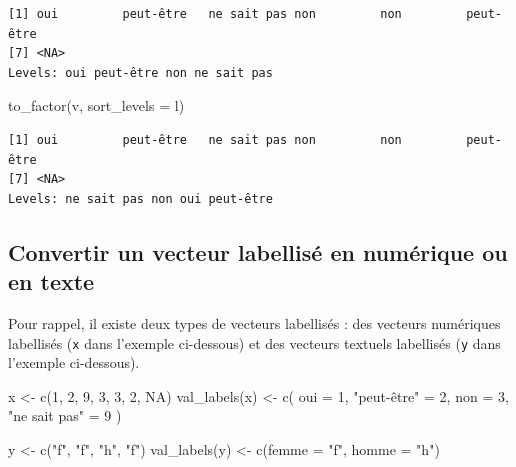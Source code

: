\documentclass[
  letterpaper,
  DIV=11,
  numbers=noendperiod,
  oneside]{scrreprt}
\newenvironment{Shaded}{\begin{snugshade}}{\end{snugshade}}
\newcommand{\AttributeTok}[1]{\textcolor[rgb]{0.40,0.45,0.13}{#1}}
\newcommand{\ConstantTok}[1]{\textcolor[rgb]{0.56,0.35,0.01}{#1}}
\newcommand{\DecValTok}[1]{\textcolor[rgb]{0.68,0.00,0.00}{#1}}
\newcommand{\FunctionTok}[1]{\textcolor[rgb]{0.28,0.35,0.67}{#1}}
\newcommand{\NormalTok}[1]{\textcolor[rgb]{0.00,0.23,0.31}{#1}}
\newcommand{\OtherTok}[1]{\textcolor[rgb]{0.00,0.23,0.31}{#1}}
\newcommand{\StringTok}[1]{\textcolor[rgb]{0.13,0.47,0.30}{#1}}
\begin{document}
\begin{verbatim}
[1] oui         peut-être   ne sait pas non         non         peut-être  
[7] <NA>       
Levels: oui peut-être non ne sait pas
\end{verbatim}

\begin{Shaded}
\begin{Highlighting}[]
\FunctionTok{to\_factor}\NormalTok{(v, }\AttributeTok{sort\_levels =} \StringTok{\textquotesingle{}l\textquotesingle{}}\NormalTok{)}
\end{Highlighting}
\end{Shaded}

\begin{verbatim}
[1] oui         peut-être   ne sait pas non         non         peut-être  
[7] <NA>       
Levels: ne sait pas non oui peut-être
\end{verbatim}

\hypertarget{convertir-un-vecteur-labellisuxe9-en-numuxe9rique-ou-en-texte}{%
\subsection{Convertir un vecteur labellisé en numérique ou en
texte}\label{convertir-un-vecteur-labellisuxe9-en-numuxe9rique-ou-en-texte}}

Pour rappel, il existe deux types de vecteurs labellisés : des vecteurs
numériques labellisés (\texttt{x} dans l'exemple ci-dessous) et des
vecteurs textuels labellisés (\texttt{y} dans l'exemple ci-dessous).

\begin{Shaded}
\begin{Highlighting}[]
\NormalTok{x }\OtherTok{\textless{}{-}} \FunctionTok{c}\NormalTok{(}\DecValTok{1}\NormalTok{, }\DecValTok{2}\NormalTok{, }\DecValTok{9}\NormalTok{, }\DecValTok{3}\NormalTok{, }\DecValTok{3}\NormalTok{, }\DecValTok{2}\NormalTok{, }\ConstantTok{NA}\NormalTok{)}
\FunctionTok{val\_labels}\NormalTok{(x) }\OtherTok{\textless{}{-}} \FunctionTok{c}\NormalTok{(}
  \AttributeTok{oui =} \DecValTok{1}\NormalTok{, }\StringTok{"peut{-}être"} \OtherTok{=} \DecValTok{2}\NormalTok{, }
  \AttributeTok{non =} \DecValTok{3}\NormalTok{, }\StringTok{"ne sait pas"} \OtherTok{=} \DecValTok{9}
\NormalTok{)}
  
\NormalTok{y }\OtherTok{\textless{}{-}} \FunctionTok{c}\NormalTok{(}\StringTok{"f"}\NormalTok{, }\StringTok{"f"}\NormalTok{, }\StringTok{"h"}\NormalTok{, }\StringTok{"f"}\NormalTok{)}
\FunctionTok{val\_labels}\NormalTok{(y) }\OtherTok{\textless{}{-}} \FunctionTok{c}\NormalTok{(}\AttributeTok{femme =} \StringTok{"f"}\NormalTok{, }\AttributeTok{homme =} \StringTok{"h"}\NormalTok{)}
\end{Highlighting}
\end{Shaded}
\end{document}
